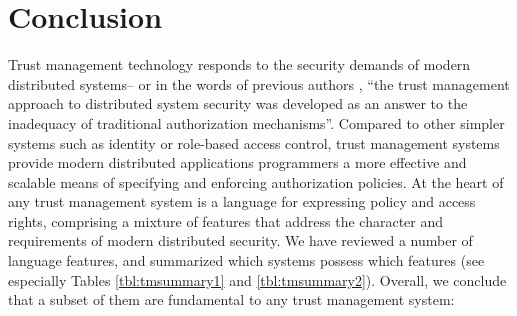 \section{Conclusion}
\label{section-conclusion}

Trust management technology responds to the security demands of modern
distributed systems-- or in the words of previous authors
\cite{Blaze:RTMDSS}, ``the trust management approach to distributed
system security was developed as an answer to the inadequacy of
traditional authorization mechanisms''.  Compared to other simpler
systems such as identity or role-based access control, trust
management systems provide modern distributed applications programmers
a more effective and scalable means of specifying and enforcing
authorization policies.  At the heart of any trust management system
is a language for expressing policy and access rights, comprising a
mixture of features that address the character and requirements of
modern distributed security.  We have reviewed a number of language
features, and summarized which systems possess which features (see
especially Tables \ref{tbl:tmsummary1} and \ref{tbl:tmsummary2}).
Overall, we conclude that a subset of them are fundamental to any
trust management system:
